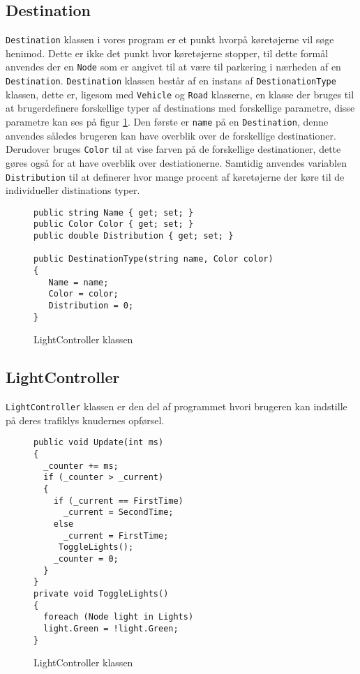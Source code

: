 \subsection{Destination}
\texttt{Destination} klassen i vores program er et punkt hvorpå køretøjerne vil søge henimod. Dette er ikke det punkt hvor køretøjerne stopper, til dette formål anvendes der en \texttt{Node} som er angivet til at være til parkering i nærheden af en \texttt{Destination}. \texttt{Destination} klassen består af en instans af \texttt{DestionationType} klassen, dette er, ligesom med \texttt{Vehicle} og \texttt{Road} klasserne, en klasse der bruges til at brugerdefinere forskellige typer af destinations med forskellige parametre, disse parametre kan ses på figur \ref{DestinationTypes}. Den første er \texttt{name} på en \texttt{Destination}, denne anvendes således brugeren kan have overblik over de forskellige destinationer. Derudover bruges \texttt{Color} til at vise farven på de forskellige destinationer, dette gøres også for at have overblik over destiationerne. Samtidig anvendes variablen \texttt{Distribution} til at definerer hvor mange procent af køretøjerne der køre til de individueller distinations typer.

\begin{figure}[H]
\begin{lstlisting}
public string Name { get; set; }
public Color Color { get; set; }
public double Distribution { get; set; }

public DestinationType(string name, Color color)
{
   Name = name;
   Color = color;
   Distribution = 0;
}
\end{lstlisting}
\caption{LightController klassen}\label{DestinationTypes}
\end{figure}

\subsection{LightController}
\texttt{LightController} klassen er den del af programmet hvori brugeren kan indstille på deres trafiklys knudernes opførsel.

\begin{figure}[H]
\begin{lstlisting}
public void Update(int ms)
{
  _counter += ms;
  if (_counter > _current)
  {
    if (_current == FirstTime)
      _current = SecondTime;
    else
      _current = FirstTime;
     ToggleLights();
    _counter = 0;
  }
}
private void ToggleLights()
{
  foreach (Node light in Lights)
  light.Green = !light.Green;
}
\end{lstlisting}
\caption{LightController klassen}\label{LightControllerKlassen}
\end{figure}

